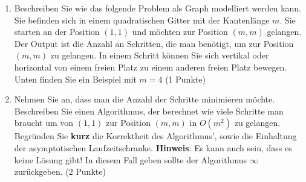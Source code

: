 \documentclass[ngerman,landscape,twocolumn]{adtexsheet}
\begin{document}
\newpage

\begin{question}
    \begin{enumerate}
        \item Beschreiben Sie wie das folgende Problem als Graph modelliert werden kann. Sie befinden sich in einem quadratischen Gitter mit der Kantenlänge $m$. Sie starten an der Position $(1, 1)$ und möchten zur Position $(m, m)$ gelangen. Der Output ist die Anzahl an Schritten, die man benötigt, um zur Position $(m, m)$ zu gelangen. In einem Schritt können Sie sich vertikal oder horizontal von einem freien Platz zu einem anderen freien Platz bewegen. Unten finden Sie ein Beispiel mit $m = 4$ (1 Punkte)
        
        \item Nehmen Sie an, dass man die Anzahl der Schritte minimieren möchte. Beschreiben Sie einen Algorithmus, der berechnet wie viele Schritte man braucht um von $(1,1)$ zur Position $(m, m)$ in $O(m^2)$ zu gelangen. Begründen Sie \textbf{kurz} die Korrektheit des Algorithmus', sowie die Einhaltung der asymptotischen Laufzeitschranke. \textbf{Hinweis}: Es kann auch sein, dass es keine Lösung gibt! In diesem Fall geben sollte der Algorithmus $\infty$ zurückgeben. (2 Punkte)
    \end{enumerate}
\end{question}
\end{document}
